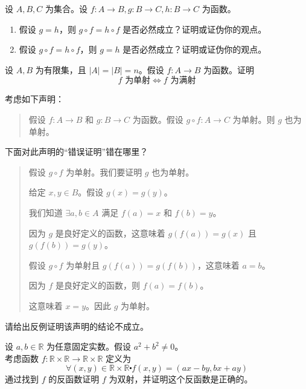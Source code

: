\begin{exercise}
    设 $A,B,C$ 为集合。设 $f : A \to B, g : B \to C, h : B \to C$ 为函数。
    \begin{enumerate}[label=(\alph*)]
        \item 假设 $g = h$，则 $g \circ f = h \circ f$ 是否必然成立？证明或证伪你的观点。
        \item 假设 $g \circ f = h \circ f$，则 $g = h$ 是否必然成立？证明或证伪你的观点。
    \end{enumerate}
\end{exercise}

\begin{exercise}
    设 $A, B$ 为有限集，且 $|A| = |B| = n$。假设 $f : A \to B$ 为函数。证明
    \[f \text{ 为单射} \iff f \text{ 为满射}\]
\end{exercise}

\begin{exercise}
    考虑如下声明：
    \begin{quote}
        假设 $f : A \to B$ 和 $g : B \to C$ 为函数。假设 $g \circ f : A \to C$ 为单射。则 $g$ 也为单射。
    \end{quote}
    下面对此声明的``错误证明''错在哪里？
    \begin{quote}
        \begin{spoof}
            假设 $g \circ f$ 为单射。我们要证明 $g$ 也为单射。

            给定 $x, y \in B$。假设 $g(x) = g(y)$。

            我们知道 $\exists a,b \in A$ 满足 $f(a) = x$ 和 $f(b) = y$。

            因为 $g$ 是良好定义的函数，这意味着 $g(f(a)) = g(x)$ 且 $g(f(b)) = g(y)$。

            假设 $g \circ f$ 为单射且 $g(f(a)) = g(f(b))$，这意味着 $a = b$。

            因为 $f$ 是良好定义的函数，则 $f(a) = f(b)$。

            这意味着 $x = y$。因此 $g$ 为单射。
        \end{spoof}
    \end{quote}
    请给出反例证明该声明的结论不成立。
\end{exercise}

\begin{exercise}
    设 $a, b \in \mathbb{R}$ 为任意固定实数。假设 $a^2 + b^2 \ne 0$。\\
    考虑函数 $f : \mathbb{R} \times \mathbb{R} \to \mathbb{R} \times \mathbb{R}$ 定义为
    \[\forall (x, y) \in \mathbb{R} \times \mathbb{R} \centerdot f(x, y) = (ax - by, bx + ay)\]
    通过找到 $f$ 的反函数证明 $f$ 为双射，并证明这个反函数是正确的。
\end{exercise}

